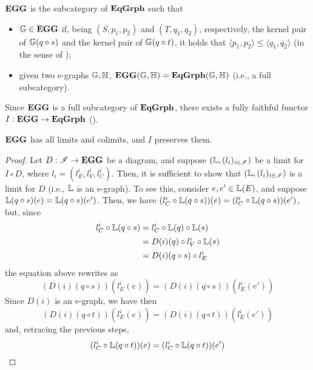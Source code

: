 \begin{definition}\label{def:cat_of_eggs}
    $\mathbf{EGG}$ is the subcategory of $\mathbf{EqGrph}$ such that
	\begin{itemize}
		\item $\mathbb{G} \in \mathbf{EGG}$ if, being $(S, p_1, p_2)$ and $(T, q_1, q_2)$, respectively, the kernel pair of $\mathbb{G}(q \circ s)$ and the kernel pair of $\mathbb{G}(q \circ t)$, it holds that $\langle p_1, p_2 \rangle \leq \langle q_1, q_2 \rangle$ (in the sense of );
		\item given two e-graphs $\mathbb{G, H}$, $\mathbf{EGG}(\mathbb{G, H}) =\mathbf{EqGrph}(\mathbb{G, H})$ (i.e., a full subcategory).
	\end{itemize}
\end{definition}

Since $\mathbf{EGG}$ is a full subcategory of $\mathbf{EqGrph}$, there exists a fully faithful functor $I: \mathbf{EGG} \to \mathbf{EqGrph}$ ().

\begin{lemma}
	$\mathbf{EGG}$ has all limits and colimits, and $I$ preserves them.
\end{lemma}

\begin{proof}
	Let $D: \mathscr{I} \to \mathbf{EGG}$ be a diagram, and suppose $(\mathbb{L}, (l_i)_{i \in \mathscr{I}})$ be a limit for $I \circ D$, where $l_i = (l_E^i, l_V^i, l_C^i)$. Then, it is sufficient to show that $(\mathbb{L}, (l_i)_{i \in \mathscr{I}})$ is a limit for $D$ (i.e., $\mathbb{L}$ is an e-graph). To see this, consider $e, e' \in \mathbb{L}(E)$, and suppose $\mathbb{L}(q \circ s)(e) = \mathbb{L}(q \circ s)(e')$. Then, we have $(l_C^i \circ \mathbb{L}(q \circ s))(e) = (l_C^i \circ \mathbb{L}(q \circ s))(e')$, but, since
	\[\begin{split}
		l_C^i \circ \mathbb{L}(q \circ s) &= l_C^i \circ \mathbb{L}(q) \circ \mathbb{L}(s) \\
						   &= D(i)(q) \circ l_V^i \circ \mathbb{L}(s)	\\
						   &= D(i)(q \circ s)\circ l_E^i
	\end{split}\]
	the equation above rewrites as
	\[(D(i)(q \circ s))(l_E^i (e)) = (D(i)(q \circ s))(l_E^i (e')) \]
	Since $D(i)$ is an e-graph, we have then
	\[(D(i)(q \circ t))(l_E^i (e)) = (D(i)(q \circ t))(l_E^i (e')) \]
	and, retracing the previous steps, \[ (l_C^i \circ \mathbb{L}(q \circ t))(e) = (l_C^i \circ \mathbb{L}(q \circ t))(e')\]
\end{proof}

